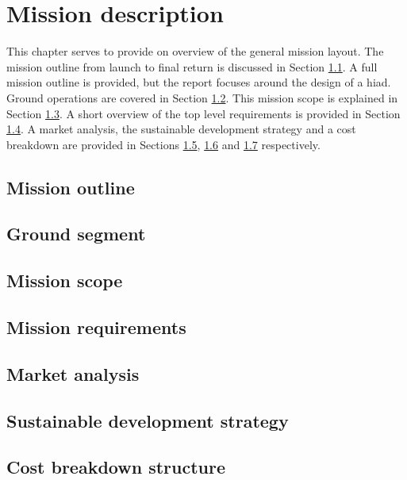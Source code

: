 \section{Mission description}\label{cha:missiondescr}

This chapter serves to provide on overview of the general mission layout. The mission outline from launch to final return is discussed in Section \ref{sec:missionoutline}. A full mission outline is provided, but the report focuses around the design of a \gls{hiad}. Ground operations are covered in Section \ref{sec:gop}. This mission scope is explained in Section \ref{sec:missionscope}. A short overview of the top level requirements is provided in Section \ref{sec:missionreq}. A market analysis, the sustainable development strategy and a cost breakdown are provided in Sections \ref{sec:marketanalysis}, \ref{sec:sustainable} and \ref{sec:costbreakdown} respectively. 

\subsection{Mission outline} \label{sec:missionoutline}


\subsection{Ground segment} \label{sec:gop}


\subsection{Mission scope} \label{sec:missionscope}


\subsection{Mission requirements} \label{sec:missionreq}


\subsection{Market analysis} \label{sec:marketanalysis}


\subsection{Sustainable development strategy} \label{sec:sustainable}


\subsection{Cost breakdown structure} \label{sec:costbreakdown}


%

